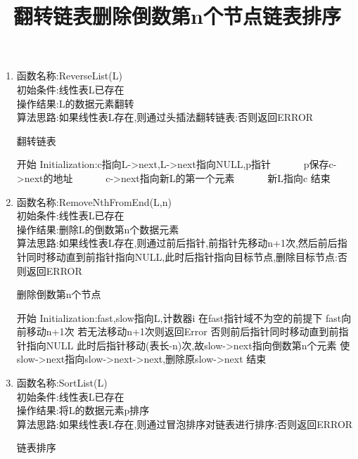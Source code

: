 \documentclass[supercite]{HustGraduPaper}
\theoremstyle{definition}
\begin{document}
\begin{enumerate}
	\item 函数名称:ReverseList(L)\\
	      初始条件:线性表L已存在\\
	      操作结果:L的数据元素翻转\\
	      算法思路:如果线性表L存在,则通过头插法翻转链表:否则返回ERROR
	      \begin{algorithm}[htb]
		      \title{翻转链表}
		      \caption{翻转链表}
		      \begin{algorithmic}[1]
			      \State 开始
			      \State Initialization:c指向L->next,L->next指向NULL,p指针
			      ~~~~~~\State p保存c->next的地址
			      ~~~~~~\State c->next指向新L的第一个元素
			      ~~~~~~\State 新L指向c
			      \EndWhile
			      \State 结束
		      \end{algorithmic}\label{L13}
	      \end{algorithm}
	\item 函数名称:RemoveNthFromEnd(L,n)\\
	      初始条件:线性表L已存在\\
	      操作结果:删除L的倒数第n个数据元素\\
	      算法思路:如果线性表L存在,则通过前后指针,前指针先移动n+1次,然后前后指针同时移动直到前指针指向NULL,此时后指针指向目标节点,删除目标节点:否则返回ERROR
	      \begin{algorithm}[htb]
		      \title{删除倒数第n个节点}
		      \caption{删除倒数第n个节点}
		      \begin{algorithmic}[1]
			      \State 开始
			      \State Initialization:fast,slow指向L,计数器i
			      \State 在fast指针域不为空的前提下 fast向前移动n+1次
			      \State 若无法移动n+1次则返回Error
			      \State 否则前后指针同时移动直到前指针指向NULL
			      \State 此时后指针移动(表长-n)次,故slow->next指向倒数第n个元素
			      \State 使slow->next指向slow->next->next,删除原slow->next
			      \State 结束
		      \end{algorithmic}\label{L14}
	      \end{algorithm}
	\item 函数名称:SortList(L)\\
	      初始条件:线性表L已存在\\
	      操作结果:将L的数据元素p排序\\
	      算法思路:如果线性表L存在,则通过冒泡排序对链表进行排序:否则返回ERROR
	      \begin{algorithm}[htb]
		      \title{链表排序}
		      \caption{链表排序}
		      \begin{algorithmic}[1]

\end{algorithmic}
\end{algorithm}
\end{enumerate}
\end{document}
